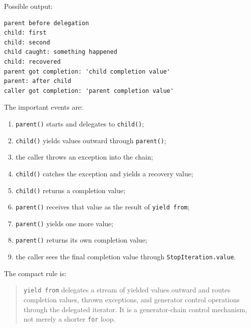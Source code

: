 Possible output:

\begin{verbatim}
parent before delegation
child: first
child: second
child caught: something happened
child: recovered
parent got completion: 'child completion value'
parent: after child
caller got completion: 'parent completion value'
\end{verbatim}

The important events are:

\begin{enumerate}
    \item \texttt{parent()} starts and delegates to \texttt{child()};
    \item \texttt{child()} yields values outward through \texttt{parent()};
    \item the caller throws an exception into the chain;
    \item \texttt{child()} catches the exception and yields a recovery value;
    \item \texttt{child()} returns a completion value;
    \item \texttt{parent()} receives that value as the result of \texttt{yield from};
    \item \texttt{parent()} yields one more value;
    \item \texttt{parent()} returns its own completion value;
    \item the caller sees the final completion value through \texttt{StopIteration.value}.
\end{enumerate}

The compact rule is:

\begin{quote}
\texttt{yield from} delegates a stream of yielded values outward and routes completion values, thrown exceptions, and generator control operations through the delegated iterator. It is a generator-chain control mechanism, not merely a shorter \texttt{for} loop.
\end{quote}